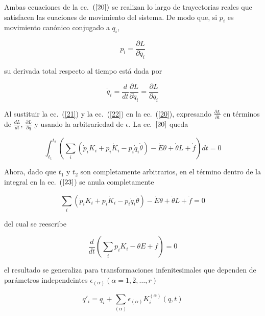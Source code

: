 \documentclass[a4paper,11pt]{article}
\begin{document}
Ambas ecuaciones de la ec.~$(\ref{20})$ se realizan  lo largo de trayectorias reales que satisfacen las euaciones de movimiento del sistema. De modo que, si \(p_i\) es movimiento canónico conjugado a \(q_i\), 

\begin{equation}
    p_i=\frac{\partial L}{\partial \dot{q}_i}
    \label{21}
\end{equation}

su derivada total respecto al tiempo está dada por

\begin{equation}
    \dot{q}_i = \frac{d}{dt} \frac{\partial L}{\partial \dot{q}_i} = \frac{\partial L}{\partial q_i}
    \label{22}
\end{equation}

Al sustituir la ec.~(\ref{21}) y la ec.~(\ref{22}) en la ec.~(\ref{20}), expresando \( \frac{\partial L}{\partial t} \) en términos de \( \frac{dL}{dt} \), \( \frac{\partial L}{\partial q} \) y usando la arbitrariedad de \(\epsilon\). La ec.~\(\ref{20}\) queda

\begin{equation}
    \int_{t_1}^{t_2} \left( \sum_i (\dot{p}_i K_i +p_i\dot{K}_i -p_i\dot{q}_i \dot{\theta}) -\dot{E}\theta +\dot{\theta} L +\dot{f} \right) dt = 0
    \label{23}
\end{equation}

Ahora, dado que \(t_1\) y \(t_2\) son completamente arbitrarios, en el término dentro de la integral en la ec.~(\(\ref{23}\)) se anula completamente 

\begin{equation}
      \sum_i (\dot{p}_i K_i +p_i\dot{K}_i -p_i\dot{q}_i \dot{\theta}) -\dot{E}\theta +\dot{\theta} L +\dot{f} = 0
\end{equation}

del cual se reescribe 

\begin{equation}
    \frac{d}{dt} \left( \sum_i p_i K_i - \theta E + f   \right) = 0
\end{equation}

el resultado se generaliza para transformaciones infenitesimales que dependen de parámetros independeintes \(\epsilon_{(\alpha)} (\alpha=1,2,\ldots,r)\) 

\begin{equation}
    q'_i=q_i+\sum_{(\alpha)} \epsilon_{(\alpha)} K^{(\alpha)} _i (q,t)
\end{equation}
\end{document}

